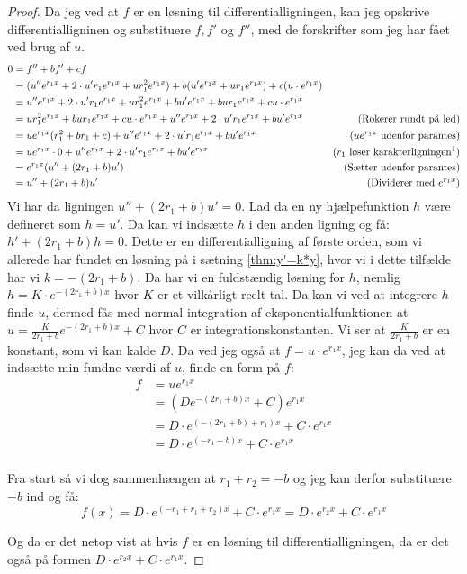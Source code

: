 \begin{proof}
Da jeg ved at $f$ er en løsning til differentialligningen, kan jeg opskrive differentialligninen og substituere $f, f'$ og $f''$, med de forskrifter som jeg har fået ved brug af $u$. 
\begin{align*}
0 	&= f'' + bf' + cf \\
	&= (u''e^{r_1 x} + 2\cdot u' r_1 e^{r_1 x} + u r_1^2 e^{r_1 x}) + b(u'e^{r_1 x} + ur_1 e^{r_1 x}) + c (u \cdot e^{r_1 x})\\
	&= u''e^{r_1 x} + 2\cdot u' r_1 e^{r_1 x} + u r_1^2 e^{r_1 x} + bu'e^{r_1 x} + bur_1 e^{r_1 x} + cu \cdot e^{r_1 x}\\
	&= u r_1^2 e^{r_1 x} + bur_1 e^{r_1 x} + cu \cdot e^{r_1 x} + u''e^{r_1 x} + 2\cdot u' r_1 e^{r_1 x} + bu'e^{r_1 x}  & \text{(Rokerer rundt på led)}\\
	&= ue^{r_1 x}(r_1^2  + br_1 + c) + u''e^{r_1 x} + 2\cdot u' r_1 e^{r_1 x} + bu'e^{r_1 x} & \text{($ue^{r_1 x}$ udenfor  parantes)}\\
	&= ue^{r_1 x} \cdot 0+ u''e^{r_1 x} + 2\cdot u' r_1 e^{r_1 x} + bu'e^{r_1 x} & \text{($r_1$ løser karakterligningen\footnotemark)}\\
	&= e^{r_1 x} (u'' + (2r_1 + b)u') & \text{(Sætter udenfor parantes)}\\
	&= u'' + (2r_1 + b)u' & \text{(Dividerer med $e^{r_1 x}$)}
\end{align*}
Vi har da ligningen $u'' + (2r_1 + b)u' = 0$. 
Lad da en ny hjælpefunktion $h$ være defineret som $h = u'$. 
Da kan vi indsætte $h$ i den anden ligning og få:
$h' + (2r_1 + b)h = 0$. 
Dette er en differentialligning af første orden, som vi allerede har fundet en løsning på i sætning \ref{thm:y'=k*y}, 
hvor vi i dette tilfælde har vi $k = -(2r_1 + b)$.
Da har vi en fuldstændig løsning for $h$, nemlig $h=K \cdot e^{-(2r_1 + b)x}$ hvor $K$ er et vilkårligt reelt tal. 
Da kan vi ved at integrere $h$ finde $u$, dermed fås med normal integration af eksponentialfunktionen at $u = \frac{K}{2r_1 + b} e^{-(2r_1 + b)x} + C$ hvor $C$ er integrationskonstanten. 
Vi ser at $\frac{K}{2r_1 + b}$ er en konstant, som vi kan kalde $D$.
Da ved jeg også at $f=u\cdot e^{r_1 x}$, jeg kan da ved at indsætte min fundne værdi af $u$, finde en form på $f$:
\begin{align*}
f 	&= ue^{r_1 x}\\
	&= (D e^{-(2r_1 + b)x} + C)e^{r_1 x} \\
	&= D \cdot e^{(-(2r_1 + b)+r_1)x} + C\cdot e^{r_1 x}\\
	&= D \cdot e^{(-r_1 - b)x} + C\cdot e^{r_1 x}\\
\end{align*}

Fra start så vi dog sammenhængen at $r_1 + r_2 = -b$ og jeg kan derfor substituere $-b$ ind og få:
$$f(x) = D \cdot e^{(-r_1 +r_1 + r_2)x} + C\cdot e^{r_1 x}= D \cdot e^{r_2 x} + C\cdot e^{r_1 x}$$

Og da er det netop vist at hvis $f$ er en løsning til differentialligningen, da er det også på formen $D \cdot e^{r_2 x} + C\cdot e^{r_1 x}$.
\end{proof}